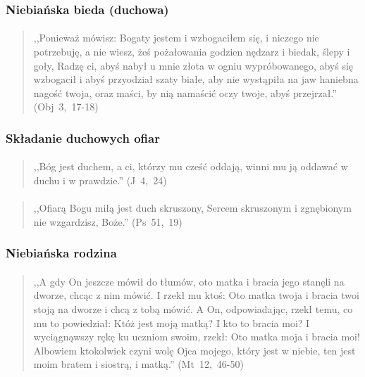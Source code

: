 \documentclass[10pt,a4paper,oneside]{article}
\begin{document}
\subsubsection{Niebiańska bieda (duchowa)}
\paragraph{}
\begin{quote}
,,Ponieważ mówisz: Bogaty jestem i wzbogaciłem się, i niczego nie potrzebuję, a nie wiesz, żeś pożałowania godzien nędzarz i biedak, ślepy i goły, Radzę ci, abyś nabył u mnie złota w ogniu wypróbowanego, abyś się wzbogacił i abyś przyodział szaty białe, aby nie wystąpiła na jaw haniebna nagość twoja, oraz maści, by nią namaścić oczy twoje, abyś przejrzał.'' \mbox{(Obj 3, 17-18)}
\end{quote}
\subsubsection{Składanie duchowych ofiar}
\paragraph{}
\begin{quote}
,,Bóg jest duchem, a ci, którzy mu cześć oddają, winni mu ją oddawać w duchu i w prawdzie.'' \mbox{(J 4, 24)}
\end{quote}
\paragraph{}
\begin{quote}
,,Ofiarą Bogu miłą jest duch skruszony, Sercem skruszonym i zgnębionym nie wzgardzisz, Boże.'' \mbox{(Ps 51, 19)}
\end{quote}
\subsubsection{Niebiańska rodzina}
\paragraph{}
\begin{quote}
,,A gdy On jeszcze mówił do tłumów, oto matka i bracia jego stanęli na dworze, chcąc z nim mówić. I rzekł mu ktoś: Oto matka twoja i bracia twoi stoją na dworze i chcą z tobą mówić. A On, odpowiadając, rzekł temu, co mu to powiedział: Któż jest moją matką? I kto to bracia moi? I wyciągnąwszy rękę ku uczniom swoim, rzekł: Oto matka moja i bracia moi! Albowiem ktokolwiek czyni wolę Ojca mojego, który jest w niebie, ten jest moim bratem i siostrą, i matką.'' \mbox{(Mt 12, 46-50)}
\end{quote}
\end{document}
